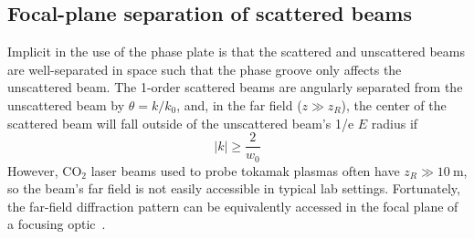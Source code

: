 \subsection{Focal-plane separation of scattered beams}
Implicit in the use of the phase plate
is that the scattered and unscattered beams
are well-separated in space
such that the phase groove only affects the unscattered beam.
The 1-order scattered beams are angularly separated
from the unscattered beam by $\theta = k / k_0$, and,
in the far field ($z \gg z_R$),
the center of the scattered beam will fall outside of
the unscattered beam's 1/e $E$ radius if
\begin{equation}
  |k| \geq \frac{2}{w_0}
  \label{eq:InterferometricMethods:kmin_for_far_field_beam_separation}
\end{equation}
However, CO$_2$ laser beams used to probe tokamak plasmas often have
$z_R \gg \SI{10}{\meter}$, so
the beam's far field is not easily accessible in typical lab settings.
Fortunately, the far-field diffraction pattern
can be equivalently accessed in the focal plane
of a focusing optic~\cite[Ch.~8]{born_and_wolf}.

